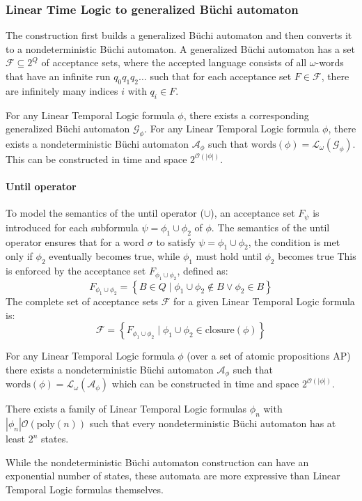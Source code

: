 \subsubsection{Linear Time Logic to generalized Büchi automaton}
The construction first builds a generalized Büchi automaton and then converts it to a nondeterministic Büchi automaton. 
A generalized Büchi automaton has a set $\mathcal{F}\subseteq 2^Q$ of acceptance sets, where the accepted language consists of all $\omega$-words that have an infinite run $q_0q_1q_2\dots$ such that for each acceptance set $F \in \mathcal{F}$, there are infinitely many indices $i$ with $q_i\in F$.

For any Linear Temporal Logic formula $\phi$, there exists a corresponding generalized Büchi automaton $\mathcal{G}_{\phi}$. 
For any Linear Temporal Logic formula $\phi$, there exists a nondeterministic Büchi automaton $\mathcal{A}_\phi$ such that $\text{words}(\phi)=\mathcal{L}_{\omega}(\mathcal{G}_{\phi})$. 
This can be constructed in time and space $2^{\mathcal{O}(\left\lvert \phi\right\rvert )}$.

\paragraph*{Until operator}
To model the semantics of the until operator ($\cup$), an acceptance set $F_\psi$  is introduced for each subformula $\psi = \phi_1 \cup \phi_2$ of $\phi$.
The semantics of the until operator ensures that for a word $\sigma$ to satisfy $\psi = \phi_1 \cup \phi_2$, the condition is met only if $\phi_2$ eventually becomes true, while $\phi_1$ must hold until $\phi_2$ becomes true
This is enforced by the acceptance set $F_{\phi_1\cup\phi_2}$, defined as: 
\[F_{\phi_1\cup\phi_2}=\left\{B \in Q\mid\phi_1\cup\phi_2\notin B \lor \phi_2\in B\right\}\]
\noindent The complete set of acceptance sets $\mathcal{F}$ for a given Linear Temporal Logic formula is:
\[\mathcal{F}=\left\{F_{\phi_1\cup\phi_2}\mid\phi_1\cup\phi_2\in\text{closure}(\phi)\right\}\]

\begin{theorem}
    For any Linear Temporal Logic formula $\phi$ (over a set of atomic propositions $\text{AP}$) there exists a nondeterministic Büchi automaton $\mathcal{A}_\phi$ such that $\text{words}(\phi)=\mathcal{L}_{\omega}(\mathcal{A}_\phi)$ which can be constructed in time and space $2^{\mathcal{O}(\left\lvert \phi\right\rvert )}$.
\end{theorem}
\begin{theorem}
    There exists a family of Linear Temporal Logic formulas $\phi_n$ with $\left\lvert \phi_n\right\rvert\mathcal{O}(\text{poly}(n))$ such that every nondeterministic Büchi automaton has at least $2^n$ states. 
\end{theorem}
\noindent While the nondeterministic Büchi automaton construction can have an exponential number of states, these automata are more expressive than Linear Temporal Logic formulas themselves.

